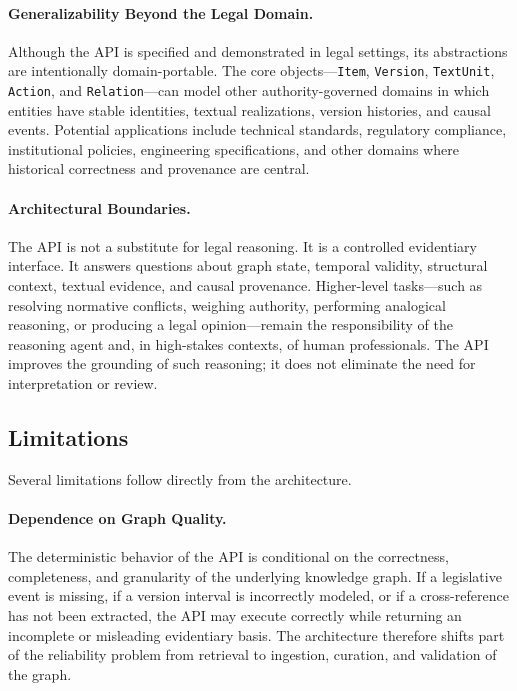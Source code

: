 \documentclass[11pt]{article}
\begin{document}
\paragraph{Generalizability Beyond the Legal Domain.}
Although the API is specified and demonstrated in legal settings, its abstractions are intentionally domain-portable. The core objects---\texttt{Item}, \texttt{Version}, \texttt{TextUnit}, \texttt{Action}, and \texttt{Relation}---can model other authority-governed domains in which entities have stable identities, textual realizations, version histories, and causal events. Potential applications include technical standards, regulatory compliance, institutional policies, engineering specifications, and other domains where historical correctness and provenance are central.

\paragraph{Architectural Boundaries.}
The API is not a substitute for legal reasoning. It is a controlled evidentiary interface. It answers questions about graph state, temporal validity, structural context, textual evidence, and causal provenance. Higher-level tasks---such as resolving normative conflicts, weighing authority, performing analogical reasoning, or producing a legal opinion---remain the responsibility of the reasoning agent and, in high-stakes contexts, of human professionals. The API improves the grounding of such reasoning; it does not eliminate the need for interpretation or review.

\subsection{Limitations}

Several limitations follow directly from the architecture.

\paragraph{Dependence on Graph Quality.}
The deterministic behavior of the API is conditional on the correctness, completeness, and granularity of the underlying knowledge graph. If a legislative event is missing, if a version interval is incorrectly modeled, or if a cross-reference has not been extracted, the API may execute correctly while returning an incomplete or misleading evidentiary basis. The architecture therefore shifts part of the reliability problem from retrieval to ingestion, curation, and validation of the graph.
\end{document}
